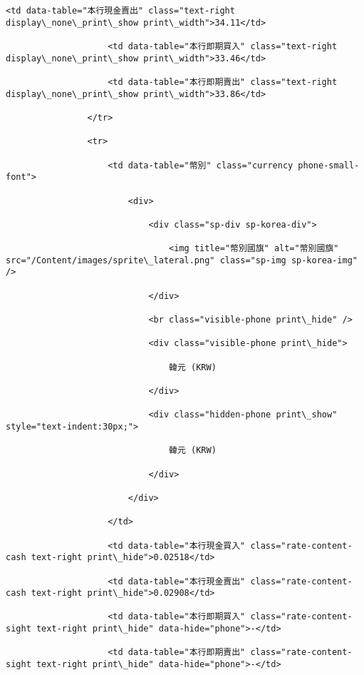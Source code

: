\documentclass[11pt]{article}
\begin{document}
\begin{Verbatim}[commandchars=\\\{\}]
                    <td data-table="本行現金賣出" class="text-right display\_none\_print\_show print\_width">34.11</td>

                    <td data-table="本行即期買入" class="text-right display\_none\_print\_show print\_width">33.46</td>

                    <td data-table="本行即期賣出" class="text-right display\_none\_print\_show print\_width">33.86</td>

                </tr>

                <tr>

                    <td data-table="幣別" class="currency phone-small-font">

                        <div>

                            <div class="sp-div sp-korea-div">

                                <img title="幣別國旗" alt="幣別國旗" src="/Content/images/sprite\_lateral.png" class="sp-img sp-korea-img" />

                            </div>

                            <br class="visible-phone print\_hide" />

                            <div class="visible-phone print\_hide">

                                韓元 (KRW)

                            </div>

                            <div class="hidden-phone print\_show" style="text-indent:30px;">

                                韓元 (KRW)

                            </div>

                        </div>

                    </td>

                    <td data-table="本行現金買入" class="rate-content-cash text-right print\_hide">0.02518</td>

                    <td data-table="本行現金賣出" class="rate-content-cash text-right print\_hide">0.02908</td>

                    <td data-table="本行即期買入" class="rate-content-sight text-right print\_hide" data-hide="phone">-</td>

                    <td data-table="本行即期賣出" class="rate-content-sight text-right print\_hide" data-hide="phone">-</td>


\end{Verbatim}
\end{document}
